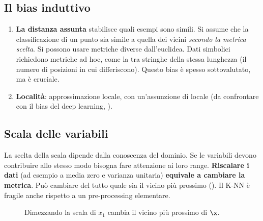 \subsection{Il bias induttivo}
\begin{enumerate}
  \item \textbf{La distanza assunta} stabilisce quali esempi sono simili. Si assume che la classificazione di un
        punto sia simile a quella dei vicini \emph{secondo la metrica scelta}. Si possono usare metriche diverse
        dall'euclidea. Dati simbolici richiedono metriche ad hoc, come la  tra
        stringhe della stessa lunghezza (il numero di posizioni in cui differiscono). Questo bias è spesso
        sottovalutato, ma è cruciale.
  \item \textbf{Località}: approssimazione locale, con un'assunzione di  locale (da confrontare
        con il bias del deep learning, ).
\end{enumerate}

\subsection{Scala delle variabili}
La scelta della scala dipende dalla conoscenza del dominio. Se le variabili devono contribuire allo stesso modo
bisogna fare attenzione ai loro range. \textbf{Riscalare i dati} (ad esempio a media zero e varianza unitaria)
\textbf{equivale a cambiare la metrica}. Può cambiare del tutto quale sia il vicino più prossimo
(). Il K-NN è fragile anche rispetto a un pre-processing elementare.

\begin{figure}[ht]
\centering
{}
\caption{Dimezzando la scala di $x_1$ cambia il vicino più prossimo di $\x$.}
\label{fig:scala}
\end{figure}

